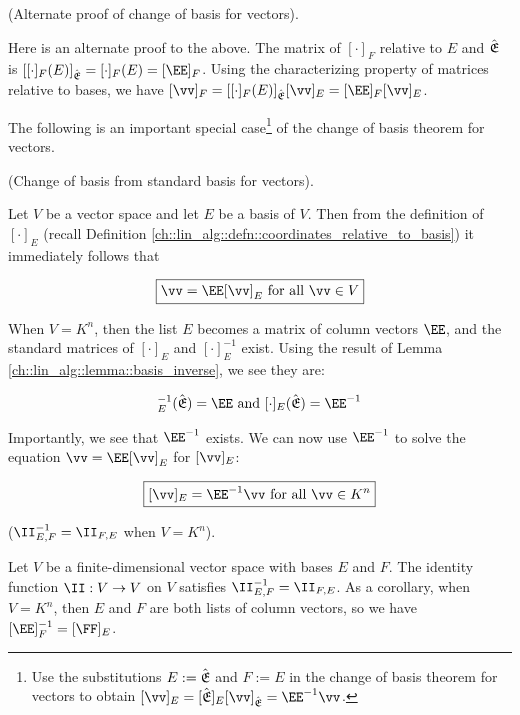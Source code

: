 \begin{remark}
    (Alternate proof of change of basis for vectors).
    
    Here is an alternate proof to the above. The matrix of $[\cdot]_F$ relative to $E$ and ${\hat{\mathfrak{E}}}$ is $[[\cdot]_F(E)]_\sE = [\cdot]_F(E) = [\EE]_F$. Using the characterizing property of matrices relative to bases, we have $[\vv]_F = [[\cdot]_F(E)]_\sE [\vv]_E = [\EE]_F [\vv]_E$.
\end{remark}

The following is an important special case\footnote{Use the substitutions $E := {\hat{\mathfrak{E}}}$ and $F := E$ in the change of basis theorem for vectors to obtain $[\vv]_E = [\sE]_E [\vv]_\sE = \EE^{-1} \vv$.} of the change of basis theorem for vectors.

\begin{theorem}
    (Change of basis from standard basis for vectors).
    \label{ch::lin_alg::thm::basis_change_from_standard_vectors}

    Let $V$ be a vector space and let $E$ be a basis of $V$. Then from the definition of $[\cdot]_E$ (recall Definition \ref{ch::lin_alg::defn::coordinates_relative_to_basis}) it immediately follows that

    \begin{align*}
        \boxed
        {
            \vv = \EE [\vv]_E \text{ for all $\vv \in V$}
        }
    \end{align*}

    When $V = K^n$, then the list $E$ becomes a matrix of column vectors $\EE$, and the standard matrices of $[\cdot]_E$ and $[\cdot]_E^{-1}$ exist. Using the result of Lemma \ref{ch::lin_alg::lemma::basis_inverse}, we see they are:

    \begin{align*}
        [\cdot]_E^{-1}(\sE) = \EE \text{ and } [\cdot]_E(\sE) = \EE^{-1}
    \end{align*}

    Importantly, we see that $\EE^{-1}$ exists. We can now use $\EE^{-1}$ to solve the equation $\vv = \EE[\vv]_E$ for $[\vv]_E$:

    \begin{align*}
        \boxed
        {
            [\vv]_E = \EE^{-1} \vv \text{ for all $\vv \in K^n$}
        }
    \end{align*}
\end{theorem}

\begin{theorem}
\label{ch::lin_alg::thm::I_EF}
    ($\II_{E,F}^{-1} = \II_{F,E}$ when $V = K^n$).
    
    Let $V$ be a finite-dimensional vector space with bases $E$ and $F$. The identity function $\II:V \rightarrow V$ on $V$ satisfies $\II_{E,F}^{-1} = \II_{F,E}$. As a corollary, when $V = K^n$, then $E$ and $F$ are both lists of column vectors, so we have $[\EE]_F^{-1} = [\FF]_E$.
\end{theorem}

